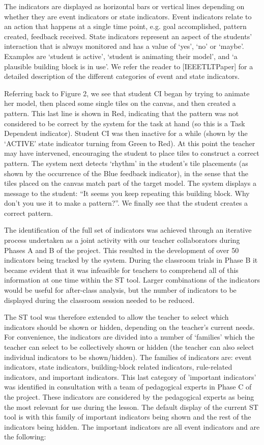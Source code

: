 The indicators are displayed as horizontal bars or vertical lines
depending on whether they are event indicators or state
indicators. Event indicators relate to an action that happens at a
single time point, e.g. goal accomplished, pattern created, feedback
received. State indicators represent an aspect of the students'
interaction that is always monitored and has a value of `yes’, `no’ or
`maybe’.  Examples are `student is active’, `student is animating
their model’, and `a plausible building block is in use’. We refer the
reader to [IEEETLTPaper] for a detailed description of the different
categories of event and state indicators.

Referring back to Figure 2, we see that student CI began by trying to
animate her model, then placed some single tiles on the canvas, and
then created a pattern. This last line is shown in Red, indicating
that the pattern was not considered to be correct by the system for
the task at hand (so this is a Task Dependent indicator). Student CI
was then inactive for a while (shown by the `ACTIVE’ state indicator
turning from Green to Red). At this point the teacher may have
intervened, encouraging the student to place tiles to construct a
correct pattern. The system next detects `rhythm’ in the student’s
tile placements (as shown by the occurrence of the Blue feedback
indicator), in the sense that the tiles placed on the canvas match
part of the target model. The system displays a message to the
student: “It seems you keep repeating this building block. Why don’t
you use it to make a pattern?”. We finally see that the student
creates a correct pattern.
  
The identification of the full set of indicators was achieved through
an iterative process undertaken as a joint activity with our teacher
collaborators during Phases A and B of the project. This resulted in
the development of over 50 indicators being tracked by the
system. During the classroom trials in Phase B it became evident that
it was infeasible for teachers to comprehend all of this information
at one time within the ST tool. Larger combinations of the indicators
would be useful for after-class analysis, but the number of indicators
to be displayed during the classroom session needed to be reduced.

The ST tool was therefore extended to allow the teacher to select
which indicators should be shown or hidden, depending on the teacher’s
current needs. For convenience, the indicators are divided into a
number of `families’ which the teacher can select to be collectively
shown or hidden (the teacher can also select individual indicators to
be shown/hidden). The families of indicators are: event indicators,
state indicators, building-block related indicators, rule-related
indicators, and important indicators. This last category of 'important
indicators' was identified in consultation with a team of pedagogical
experts in Phase C of the project. These indicators are considered by
the pedagogical experts as being the most relevant for use during the
lesson. The default display of the current ST tool is with this family
of important indicators being shown and the rest of the indicators
being hidden.  The important indicators are all event indicators and
are the following:

